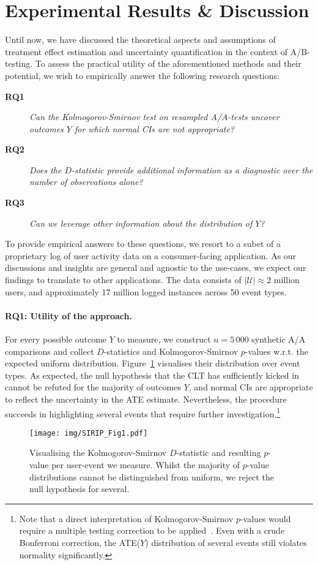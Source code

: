 \section{Experimental Results \& Discussion}
Until now, we have discussed the theoretical aspects and assumptions of treatment effect estimation and uncertainty quantification in the context of A/B-testing.
To assess the practical utility of the aforementioned methods and their potential, we wish to empirically answer the following research questions:

\begin{description}
    \item[\textbf{RQ1}] \textit{Can the Kolmogorov-Smirnov test on resampled A/A-tests uncover outcomes $Y$ for which normal CIs are not appropriate?}
    \item[\textbf{RQ2}] \textit{Does the $D$-statistic provide additional information as a diagnostic over the number of observations alone?}
    \item[\textbf{RQ3}] \textit{Can we leverage other information about the distribution of $Y$?}
\end{description}

To provide empirical answers to these questions, we resort to a subet of a proprietary log of user activity data on a consumer-facing application. 
As our discussions and insights are general and agnostic to the use-cases, we expect our findings to translate to other applications.
The data consists of $|\mathcal{U}|\approx2$  million users, and approximately 17 million logged instances across 50 event types.

\paragraph{\textbf{RQ1}: Utility of the approach.}
For every possible outcome $Y$ to measure, we construct $n=5\,000$ synthetic A/A comparisons and collect $D$-statistics and Kolmogorov-Smirnov $p$-values w.r.t. the expected uniform distribution.
Figure~\ref{fig:1} visualises their distribution over event types.
As expected, the null hypothesis that the CLT has sufficiently kicked in cannot be refuted for the majority of outcomes $Y$, and normal CIs are appropriate to reflect the uncertainty in the ATE estimate.
Nevertheless, the procedure succeeds in highlighting several events that require further investigation.\footnote{Note that a direct interpretation of Kolmogorov-Smirnov $p$-values would require a multiple testing correction to be applied~\cite{Shaffer1995}. Even with a crude Bonferroni correction, the ATE($Y$) distribution of several events still violates normality significantly.}
\begin{figure}[!t]
    \centering
    \texttt{[image: img/SIRIP\_Fig1.pdf]}
    \caption{Visualising the Kolmogorov-Smirnov $D$-statistic and resulting $p$-value per user-event we measure. Whilst the majority of $p$-value distributions cannot be distinguished from uniform, we reject the null hypothesis for several.}
    \label{fig:1}
\end{figure}

